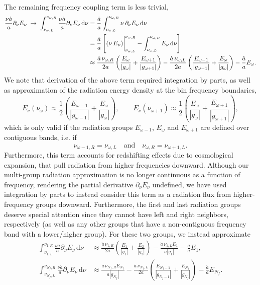 \documentclass[10pt]{article}
\renewcommand{\(}{\left(}
\renewcommand{\)}{\right)}
\newcommand{\adot}{\dot{a}}
\newcommand{\Enu}{E_{\nu}}
\begin{document}
The remaining frequency coupling term is less trivial,
\begin{align}
\notag
   \frac{\nu \adot}{a}\partial_{\nu}\Enu \;\rightarrow\;
   \int_{\nu_{\omega,L}}^{\nu_{\omega,R}} \frac{\nu \adot}{a}\partial_{\nu}\Enu\,\mathrm d\nu
   &=
   \frac{\adot}{a} \int_{\nu_{\omega,L}}^{\nu_{\omega,R}} \nu\,\partial_{\nu}\Enu\,\mathrm d\nu \\
\label{eq:multigroup_redshifting}
   &=
   \frac{\adot}{a}
   \left[(\nu\,\Enu)\bigg\vert_{\nu_{\omega,L}}^{\nu_{\omega,R}} - \int_{\nu_{\omega,L}}^{\nu_{\omega,R}} \Enu\,\mathrm d\nu\right]\\
\notag
   &\approx
   \frac{\adot\, \nu_{\omega,R}}{2a}\left(\frac{E_{\omega}}{|g_{\omega}|} + \frac{E_{\omega+1}}{|g_{\omega+1}|}\right) -
   \frac{\adot\, \nu_{\omega,L}}{2a}\left(\frac{E_{\omega-1}}{|g_{\omega-1}|}+\frac{E_{\omega}}{|g_{\omega}|}\right) - 
   \frac{\adot}{a}E_{\omega}.
\end{align}
We note that derivation of the above term required integration by
parts, as well as approximation of the radiation energy density at the
bin frequency boundaries, 
\[
   \Enu(\nu_{\omega}) \approx \frac12\left(\frac{E_{\omega-1}}{|g_{\omega-1}|}+\frac{E_{\omega}}{|g_{\omega}|}\right), \qquad
   \Enu(\nu_{\omega+1}) \approx \frac12\left(\frac{E_{\omega}}{|g_{\omega}|} + \frac{E_{\omega+1}}{|g_{\omega+1}|}\right),
\]
which is only valid if the radiation groups $E_{\omega-1}$,
$E_{\omega}$ and $E_{\omega+1}$ are defined over contiguous bands,
i.e. if
\begin{equation}
\label{eq:contiguous_bands}
   \nu_{\omega-1,R} = \nu_{\omega,L} \quad\text{and}\quad
   \nu_{\omega,R} = \nu_{\omega+1,L}.
\end{equation}
Furthermore, this term accounts for redshifting effects due to
cosmological expansion, that pull radiation from higher frequencies
downward.  Although our multi-group radiation approximation is no
longer continuous as a function of frequency, rendering the partial
derivative $\partial_\nu\Enu$ undefined, we have used integration by
parts to instead consider this term as a radiation flux from
higher-frequency groups downward.  Furthermore, the first and last
radiation groups deserve special attention since they cannot have
left and right neighbors, respectively (as well as any other groups
that have a non-contiguous frequency band with a lower/higher group).
For these two groups, we instead approximate 
\begin{align}
 \label{eq:multigroup_redshifting_left}
   \int_{\nu_{1,L}}^{\nu_{1,R}} \frac{\nu \adot}{a}\partial_{\nu}\Enu\,\mathrm d\nu
   &\approx
   \frac{\adot\, \nu_{1,R}}{2a}\left(\frac{E_1}{|g_1|} + \frac{E_2}{|g_2|}\right) -
   \frac{\adot\, \nu_{1,L} E_1}{a|g_1|} - \frac{\adot}{a}E_1,
\\
 \label{eq:multigroup_redshifting_right}
   \int_{\nu_{N_f,L}}^{\nu_{N_f,R}} \frac{\nu \adot}{a}\partial_{\nu}\Enu\,\mathrm d\nu
   &\approx
   \frac{\adot\, \nu_{N_f,R} E_{N_f}}{a|g_{N_f}|} -
   \frac{\adot\, \nu_{N_f,L}}{2a}\left(\frac{E_{N_f-1}}{|g_{N_f-1}|}+\frac{E_{N_f}}{|g_{N_f}|}\right) - 
   \frac{\adot}{a}E_{N_f}.
\end{align}
\end{document}
